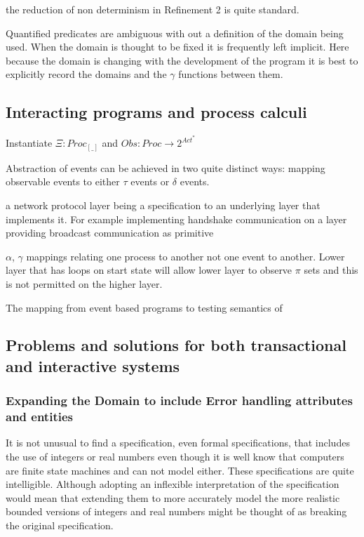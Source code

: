 the reduction of non determinism in {\sf Refinement 2} is quite standard.


Quantified predicates are ambiguous with out a definition of the domain being used. When the domain is thought to be fixed it is frequently left implicit. Here because the domain is changing with the development of the program it is best to explicitly record the domains and the $\gamma$ functions between them.



\subsection{Interacting programs and process calculi} \label{sec:pc}
Instantiate $\Xi: Proc_{[\_]}$  and $Obs : Proc\rightarrow 2^{Act^*}$


Abstraction of events can be achieved in two quite distinct ways:  mapping observable events to either $\tau$ events or $\delta$ events.

a network protocol layer being a specification to an underlying layer that implements it. For example implementing handshake communication on a layer providing broadcast communication as primitive

$\alpha$, $\gamma$ mappings relating one process to another not one event to another. Lower layer that has loops on start state will allow lower layer to observe  $\pi$ sets and this is not permitted on the higher layer.

The mapping from event based programs to testing semantics of 


\subsection{Problems and solutions for both transactional and interactive systems}

\subsubsection{Expanding the Domain to include Error handling attributes and entities}
It is not unusual to find a specification, even formal specifications, that includes the use of integers or real numbers even though it is well know that computers are finite state machines and can not model either. These specifications are quite intelligible. Although adopting an inflexible interpretation of the specification  would mean that extending them to more accurately model the more realistic bounded versions of integers and real numbers might be thought of as breaking the original specification.

